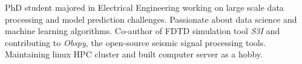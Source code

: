 

\begin{cvparagraph}

PhD student majored in Electrical Engineering working on large scale data processing and model prediction challenges. Passionate about data science and machine learning algorithms. Co-author of FDTD simulation tool \textit{S3I} and contributing to \textit{Obspy}, the open-source seismic signal processing tools. Maintaining linux HPC cluster and built computer server as a hobby.
\end{cvparagraph}
